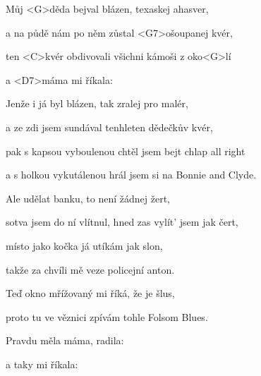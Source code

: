 

\zs
Můj <G>děda bejval blázen, texaskej ahasver,

a na půdě nám po něm zůstal <G7>ošoupanej kvér,

ten <C>kvér obdivovali všichni kámoši z oko<G>lí

a <D7>máma mi říkala: 
\ks

\zs
Jenže i já byl blázen, tak zralej pro malér,

a ze zdi jsem sundával tenhleten dědečkův kvér,

pak s kapsou vyboulenou chtěl jsem bejt chlap all right

a s holkou vykutálenou hrál jsem si na Bonnie and Clyde.
\ks

\zs
Ale udělat banku, to není žádnej žert,

sotva jsem do ní vlítnul, hned zas vylít' jsem jak čert,

místo jako kočka já utíkám jak slon,

takže za chvíli mě veze policejní anton.
\ks

\zs
Teď okno mřížovaný mi říká, že je šlus,

proto tu ve věznici zpívám tohle Folsom Blues.

Pravdu měla máma, radila: 

a taky mi říkala: 
\ks

\kp
